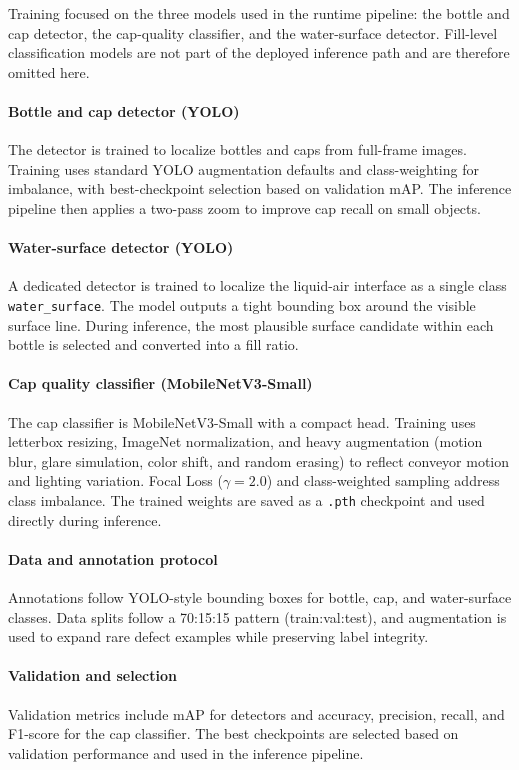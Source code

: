 \documentclass[12pt,a4paper]{report}
\begin{document}
Training focused on the three models used in the runtime pipeline: the bottle and cap detector, the cap-quality classifier, and the water-surface detector. Fill-level classification models are not part of the deployed inference path and are therefore omitted here.

\paragraph{Bottle and cap detector (YOLO)}
The detector is trained to localize bottles and caps from full-frame images. Training uses standard YOLO augmentation defaults and class-weighting for imbalance, with best-checkpoint selection based on validation mAP. The inference pipeline then applies a two-pass zoom to improve cap recall on small objects.

\paragraph{Water-surface detector (YOLO)}
A dedicated detector is trained to localize the liquid-air interface as a single class \texttt{water\_surface}. The model outputs a tight bounding box around the visible surface line. During inference, the most plausible surface candidate within each bottle is selected and converted into a fill ratio.

\paragraph{Cap quality classifier (MobileNetV3-Small)}
The cap classifier is MobileNetV3-Small with a compact head. Training uses letterbox resizing, ImageNet normalization, and heavy augmentation (motion blur, glare simulation, color shift, and random erasing) to reflect conveyor motion and lighting variation. Focal Loss ($\gamma=2.0$) and class-weighted sampling address class imbalance. The trained weights are saved as a \texttt{.pth} checkpoint and used directly during inference.

\paragraph{Data and annotation protocol}
Annotations follow YOLO-style bounding boxes for bottle, cap, and water-surface classes. Data splits follow a 70:15:15 pattern (train:val:test), and augmentation is used to expand rare defect examples while preserving label integrity.

\paragraph{Validation and selection}
Validation metrics include mAP for detectors and accuracy, precision, recall, and F1-score for the cap classifier. The best checkpoints are selected based on validation performance and used in the inference pipeline.
\end{document}
